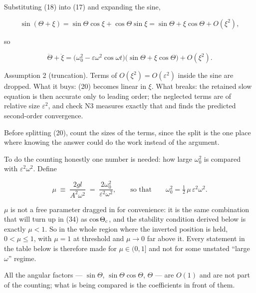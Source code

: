 \documentclass[11pt,a4paper]{article}
\newcommand{\tagmark}[1]{\marginnote{\scriptsize\ttfamily #1}}
\newcommand{\Dtag}{\tagmark{[D]}}   %
\newcommand{\Atag}{\tagmark{[A]}}   %
\begin{document}
Substituting (18) into (17) and expanding the sine,

\begin{equation}
\sin(\Theta+\xi) = \sin\Theta\cos\xi + \cos\Theta\sin\xi
   = \sin\Theta + \xi\cos\Theta + O(\xi^2), \tag{19}
\end{equation}

so

\begin{equation}
\ddot\Theta + \ddot\xi
 = \bigl(\omega_0^2-\varepsilon\omega^2\cos\omega t\bigr)
   \bigl(\sin\Theta + \xi\cos\Theta\bigr) + O(\xi^2). \tag{20}
\end{equation}

\Atag{} Assumption 2 (truncation). Terms of \(O(\xi^2)=O(\varepsilon^2)\)
inside the sine are dropped. What it buys: (20) becomes linear in \(\xi\). What
breaks: the retained slow equation is then accurate only to leading order; the
neglected terms are of relative size \(\varepsilon^2\), and check N3 measures
exactly that and finds the predicted second-order convergence.

Before splitting (20), count the sizes of the terms, since the split is the one
place where knowing the answer could do the work instead of the argument.

To do the counting honestly one number is needed: how large \(\omega_0^2\) is
compared with \(\varepsilon^2\omega^2\). Define

\begin{equation}
\mu \;\equiv\; \frac{2gl}{A^2\omega^2}
  \;=\; \frac{2\omega_0^2}{\varepsilon^2\omega^2},
  \qquad\text{so that}\qquad
  \omega_0^2 = \tfrac12\,\mu\,\varepsilon^2\omega^2. \tag{20a}
\end{equation}

\Dtag{} \(\mu\) is not a free parameter dragged in for convenience: it is the same
combination that will turn up in (34) as \(\cos\Theta_{\rm c}\), and the stability
condition derived below is exactly \(\mu<1\). So in the whole region where the
inverted position is held, \(0<\mu\le1\), with \(\mu=1\) at threshold and
\(\mu\to0\) far above it. Every statement in the table below is therefore made
for \(\mu\in(0,1]\) and not for some unstated ``large \(\omega\)'' regime.

All the angular factors --- \(\sin\Theta\), \(\sin\Theta\cos\Theta\), \(\Theta\) --- are
\(O(1)\) and are not part of the counting; what is being compared is the
coefficients in front of them.
\end{document}
